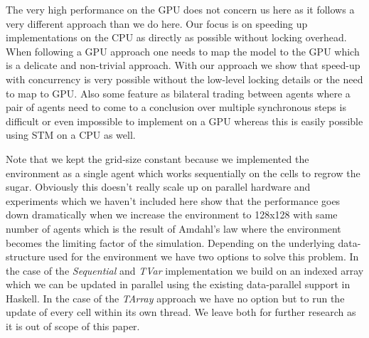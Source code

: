 The very high performance on the GPU does not concern us here as it follows a very different approach than we do here. Our focus is on speeding up implementations on the CPU as directly as possible without locking overhead. When following a GPU approach one needs to map the model to the GPU which is a delicate and non-trivial approach. With our approach we show that speed-up with concurrency is very possible without the low-level locking details or the need to map to GPU. Also some feature as bilateral trading between agents where a pair of agents need to come to a conclusion over multiple synchronous steps is difficult or even impossible to implement on a GPU whereas this is easily possible using STM on a CPU as well.

Note that we kept the grid-size constant because we implemented the environment as a single agent which works sequentially on the cells to regrow the sugar. Obviously this doesn't really scale up on parallel hardware and experiments which we haven't included here show that the performance goes down dramatically when we increase the environment to 128x128 with same number of agents which is the result of Amdahl's law where the environment becomes the limiting factor of the simulation. Depending on the underlying data-structure used for the environment we have two options to solve this problem. In the case of the \textit{Sequential} and \textit{TVar} implementation we build on an indexed array which we can be updated in parallel using the existing data-parallel support in Haskell. In the case of the \textit{TArray} approach we have no option but to run the update of every cell within its own thread. We leave both for further research as it is out of scope of this paper.

